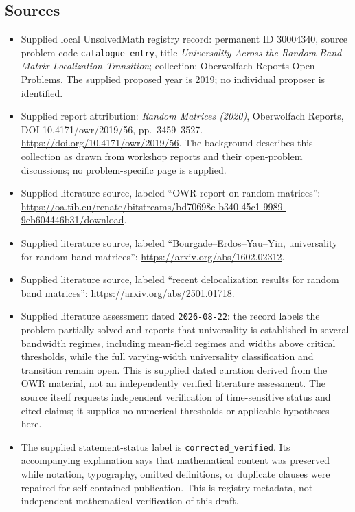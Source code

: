 \documentclass[11pt]{article}
\begin{document}
\subsection{Sources}
\begin{itemize}
\item Supplied local UnsolvedMath registry record: permanent ID \(30004340\), source problem code \texttt{catalogue entry}, title \emph{Universality Across the Random-Band-Matrix Localization Transition}; collection: Oberwolfach Reports Open Problems. The supplied proposed year is 2019; no individual proposer is identified.
\item Supplied report attribution: \emph{Random Matrices (2020)}, Oberwolfach Reports, DOI 10.4171/owr/2019/56, pp.\ 3459--3527. \url{https://doi.org/10.4171/owr/2019/56}. The background describes this collection as drawn from workshop reports and their open-problem discussions; no problem-specific page is supplied.
\item Supplied literature source, labeled ``OWR report on random matrices'': \url{https://oa.tib.eu/renate/bitstreams/bd70698e-b340-45c1-9989-9cb604446b31/download}.
\item Supplied literature source, labeled ``Bourgade--Erdos--Yau--Yin, universality for random band matrices'': \url{https://arxiv.org/abs/1602.02312}.
\item Supplied literature source, labeled ``recent delocalization results for random band matrices'': \url{https://arxiv.org/abs/2501.01718}.
\item Supplied literature assessment dated \texttt{2026-08-22}: the record labels the problem partially solved and reports that universality is established in several bandwidth regimes, including mean-field regimes and widths above critical thresholds, while the full varying-width universality classification and transition remain open. This is supplied dated curation derived from the OWR material, not an independently verified literature assessment. The source itself requests independent verification of time-sensitive status and cited claims; it supplies no numerical thresholds or applicable hypotheses here.
\item The supplied statement-status label is \texttt{corrected\_verified}. Its accompanying explanation says that mathematical content was preserved while notation, typography, omitted definitions, or duplicate clauses were repaired for self-contained publication. This is registry metadata, not independent mathematical verification of this draft.
\end{itemize}
\end{document}
